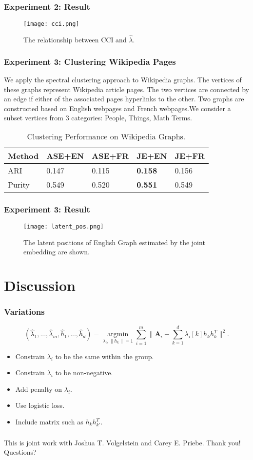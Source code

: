 \documentclass[]{beamer}
\newcommand{\bA}{\mathbf{A}}
\begin{document}
\begin{frame}
	\frametitle{Experiment 2: Result}
\begin{figure}[!htbp]
	\centering
	\texttt{[image: cci.png]}
	\caption{The relationship between CCI and $\hat{\lambda}$.}
	\label{fig:cci}
\end{figure}
\end{frame}

\begin{frame}
	\frametitle{Experiment 3: Clustering Wikipedia Pages}
	We apply the spectral clustering approach to Wikipedia graphs. The vertices of these graphs represent Wikipedia article pages. The two vertices are connected by an edge if either of the associated pages hyperlinks to the other. Two graphs are constructed based on English webpages and French webpages.We consider a subset vertices  from $3$ categories: People, Things, Math Terms.
	\begin{table}[]
		\centering
		\begin{tabular}{|l|l|l|l|l|}
			\hline
			Method& ASE+EN  & ASE+FR  & JE+EN & JE+FR \\\hline
			ARI& 0.147 & 0.115  &{\bf 0.158} & 0.156   \\\hline
			Purity& 0.549 & 0.520 &{\bf 0.551} & 0.549 \\
			\hline
		\end{tabular}
		\caption{Clustering Performance on Wikipedia Graphs.}
		\label{tb:wiki}
	\end{table}
\end{frame}

\begin{frame}
	\frametitle{Experiment 3: Result}
\begin{figure}[!htbp]
	\centering
	\texttt{[image: latent\_pos.png]}
	\caption{The latent positions of English Graph estimated by the joint embedding are shown. }
	\label{fig:lp}
\end{figure}
\end{frame}



\section{Discussion}
\begin{frame}
\frametitle{Variations}
\begin{equation*}
(\hat{\lambda}_1,...,\hat{\lambda}_m,\hat{h}_1,...,\hat{h}_d) = \underset{\lambda_i,\|h_k\|=1}{\operatorname{argmin}} \sum\limits_{i=1}^{m} \| \bA_i- \sum\limits_{k=1}^{d} \lambda_{i}[k] h_k h_k^T \|  ^2.  
\end{equation*}
\begin{itemize}
	\item Constrain $\lambda_i$ to be the same within the group.
	\item Constrain $\lambda_i$ to be non-negative.
	\item Add penalty on $\lambda_i$.
	\item Use logistic loss.
	\item Include matrix such as $h_k h_{k'}^T$.
\end{itemize}
\end{frame}


\begin{frame}
\frametitle{}
{\Large This is joint work with Joshua T. Volgelstein and Carey E. Priebe.}
\newline
\newline
{\Large Thank you! Questions?}
\end{frame}
\end{document}
